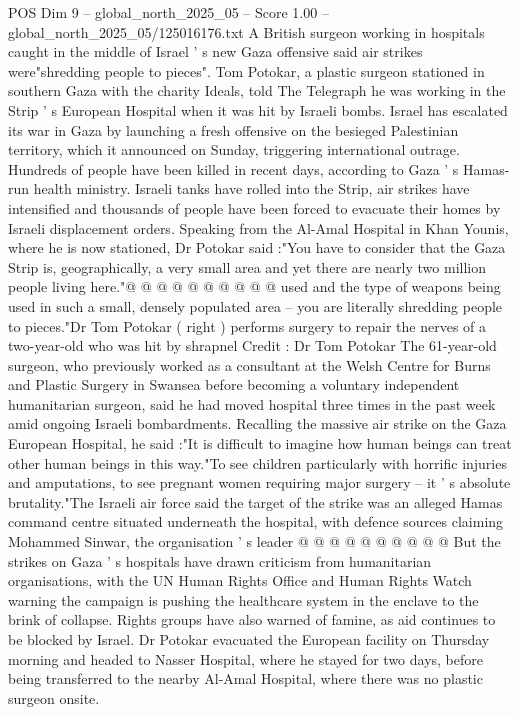 \begin{textsample}{POS Dim 9 – global\_north\_2025\_05 – Score 1.00 – global\_north\_2025\_05/125016176.txt}  \label{ex:f9_pos_273}
A British surgeon working in hospitals caught in the middle of Israel ' s new Gaza offensive said air strikes were"shredding people to pieces".
Tom Potokar, a plastic surgeon stationed in southern Gaza with the charity Ideals, told The Telegraph he was working in the Strip ' s European Hospital when it was hit by Israeli bombs.
Israel has escalated its war in Gaza by launching a fresh offensive on the besieged Palestinian territory, which it announced on Sunday, triggering international outrage.
Hundreds of people have been killed in recent days, according to Gaza ' s Hamas-run health ministry.
Israeli tanks have rolled into the Strip, air strikes have intensified and thousands of people have been forced to evacuate their homes by Israeli displacement orders.
Speaking from the Al-Amal Hospital in Khan Younis, where he is now stationed, Dr Potokar said :"You have to consider that the Gaza Strip is, geographically, a very small area and yet there are nearly two million people living here."@ @ @ @ @ @ @ @ @ @ used and the type of weapons being used in such a small, densely populated area -- you are literally shredding people to pieces."Dr Tom Potokar ( right ) performs surgery to repair the nerves of a two-year-old who was hit by shrapnel Credit : Dr Tom Potokar The 61-year-old surgeon, who previously worked as a consultant at the Welsh Centre for Burns and Plastic Surgery in Swansea before becoming a voluntary independent humanitarian surgeon, said he had moved hospital three times in the past week amid ongoing Israeli bombardments.
Recalling the massive air strike on the Gaza European Hospital, he said :"It is difficult to imagine how human beings can treat other human beings in this way."To see children particularly with horrific injuries and amputations, to see pregnant women requiring major surgery -- it ' s absolute brutality."The Israeli air force said the target of the strike was an alleged Hamas command centre situated underneath the hospital, with defence sources claiming Mohammed Sinwar, the organisation ' s leader @ @ @ @ @ @ @ @ @ @ But the strikes on Gaza ' s hospitals have drawn criticism from humanitarian organisations, with the UN Human Rights Office and Human Rights Watch warning the campaign is pushing the healthcare system in the enclave to the brink of collapse.
Rights groups have also warned of famine, as aid continues to be blocked by Israel.
Dr Potokar evacuated the European facility on Thursday morning and headed to Nasser Hospital, where he stayed for two days, before being transferred to the nearby Al-Amal Hospital, where there was no plastic surgeon onsite.

\end{textsample}
